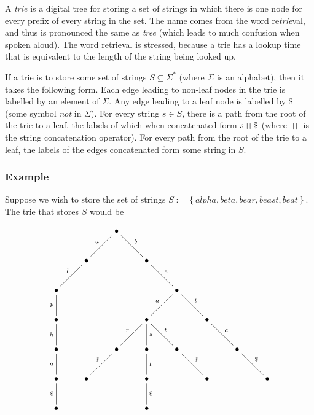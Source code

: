 \documentclass[12pt]{article}
\newcommand{\concat}{{\ensuremath{+\hspace{-1ex}+}}}
\begin{document}

A \emph{trie} is a digital tree for storing a set of strings in which there is one node for every prefix of every string in the set.  The name comes from the word
re\emph{trie}val, and thus is pronounced the same as \emph{tree} (which leads to much confusion when spoken aloud).  The word retrieval is stressed, because a trie has a lookup time that is equivalent to the length of the string being looked up.

If a trie is to store some set of strings $S\subseteq\Sigma^*$ (where $\Sigma$ is an alphabet),
then it takes the following form.
Each edge leading to non-leaf nodes in the trie is labelled by an element of $\Sigma$.  Any edge leading to a leaf node is labelled by $\$$ (some symbol \emph{not} in $\Sigma$).  For every string $s\in S$, there is a path from the root of the trie to a leaf, the labels of which when concatenated form $s\concat\$$ (where $\concat$ is the string concatenation operator).  For every path from the root of the trie to a leaf, the labels of the edges concatenated form some string in $S$.

\subsubsection*{Example}

Suppose we wish to store the set of strings $S := \left\{ alpha, beta, bear, beast, beat \right\}$.  The trie that stores $S$ would be

$$
\xymatrix{
    &&\bullet \ar@{-}[dl]_a \ar@{-}[dr]^b \\
    &\bullet \ar@{-}[dl]_l && \bullet \ar@{-}[dr]^e \\
    \bullet \ar@{-}[d]_p &&&& \bullet \ar@{-}[dl]_a \ar@{-}[dr]^t \\
    \bullet \ar@{-}[d]_h &&& \bullet \ar@{-}[dl]_r \ar@{-}[d]^s \ar@{-}[dr]^t && \bullet \ar@{-}[dr]^a \\
    \bullet \ar@{-}[d]_a && \bullet \ar@{-}[dl]_{\$} & \bullet \ar@{-}[d]^t & \bullet \ar@{-}[dr]^{\$} && \bullet \ar@{-}[dr]^{\$} \\
    \bullet \ar@{-}[d]_{\$} & \bullet && \bullet \ar@{-}[d]^{\$} && \bullet && \bullet \\
    \bullet &&& \bullet
}
$$
\end{document}
